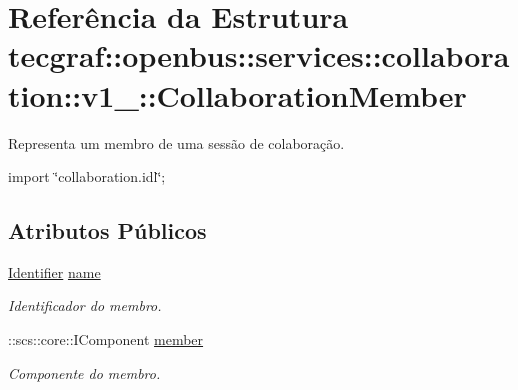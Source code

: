 \hypertarget{structtecgraf_1_1openbus_1_1services_1_1collaboration_1_1v1__0_1_1CollaborationMember}{\section{\-Referência da \-Estrutura tecgraf\-:\-:openbus\-:\-:services\-:\-:collaboration\-:\-:v1\-\_\-:\-:\-Collaboration\-Member}
\label{structtecgraf_1_1openbus_1_1services_1_1collaboration_1_1v1__0_1_1CollaborationMember}
}


\-Representa um membro de uma sessão de colaboração.  




{\ttfamily import \char`\"{}collaboration.\-idl\char`\"{};}

\subsection*{\-Atributos \-Públicos}
\begin{DoxyCompactItemize}
\item 
\hypertarget{structtecgraf_1_1openbus_1_1services_1_1collaboration_1_1v1__0_1_1CollaborationMember_a750e010d33656d8cf73d2491533ff943}{\hyperlink{namespacetecgraf_1_1openbus_1_1services_1_1collaboration_1_1v1__0_a75ab61291da492f86a7ea465804c7e45}{\-Identifier} \hyperlink{structtecgraf_1_1openbus_1_1services_1_1collaboration_1_1v1__0_1_1CollaborationMember_a750e010d33656d8cf73d2491533ff943}{name}}\label{structtecgraf_1_1openbus_1_1services_1_1collaboration_1_1v1__0_1_1CollaborationMember_a750e010d33656d8cf73d2491533ff943}

\begin{DoxyCompactList}\small\item\em \-Identificador do membro. \end{DoxyCompactList}\item 
\hypertarget{structtecgraf_1_1openbus_1_1services_1_1collaboration_1_1v1__0_1_1CollaborationMember_a440f4927d416a0ace8a839681638831d}{\-::scs\-::core\-::\-I\-Component \hyperlink{structtecgraf_1_1openbus_1_1services_1_1collaboration_1_1v1__0_1_1CollaborationMember_a440f4927d416a0ace8a839681638831d}{member}}\label{structtecgraf_1_1openbus_1_1services_1_1collaboration_1_1v1__0_1_1CollaborationMember_a440f4927d416a0ace8a839681638831d}

\begin{DoxyCompactList}\small\item\em \-Componente do membro. \end{DoxyCompactList}\end{DoxyCompactItemize}


